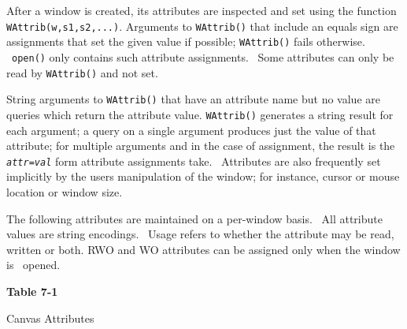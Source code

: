 
After a window is created, its attributes are inspected and set using
the function \texttt{WAttrib(w,s1,s2,...)}. Arguments to
\texttt{WAttrib()} that include an equals sign are assignments that set
the given value if possible; \texttt{WAttrib()} fails otherwise.
\ \texttt{open()} only contains such attribute assignments. \ Some
attributes can only be read by \texttt{WAttrib()} and not set.

String arguments to \texttt{WAttrib()} that have an attribute name but
no value are queries which return the attribute value.
\texttt{WAttrib()} generates a string result for each argument; a query
on a single argument produces just the value of that attribute; for
multiple arguments and in the case of assignment, the result is the
\texttt{\textit{attr}}\texttt{=}\texttt{\textit{val}} form attribute
assignments take. \ Attributes are also frequently set implicitly by
the user{\textquotesingle}s manipulation of the window; for instance,
cursor or mouse location or window size.

The following attributes are maintained on a per-window basis. \ All
attribute values are string encodings. \ Usage refers to whether the
attribute may be read, written or both. RWO and WO attributes can be
assigned only when the window is \ opened.

\bigskip

{\centering\sffamily\bfseries
Table 7-1

Canvas Attributes
}


